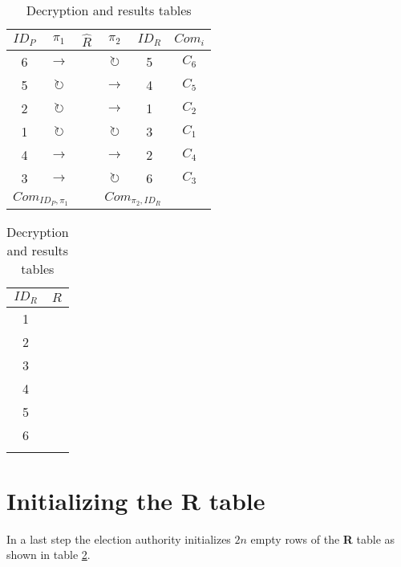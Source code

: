 \begin{table}[h]
	\begin{subtable}{.6\linewidth}
		\centering
		\begin{tabular}{|c|c|c|c|c|c|}
			\hline
			$ID_P$ & $\pi_1$ & $\hat{R}$ & $\pi_2$ & $ID_R$ & $Com_{i}$ \\
			\hline
			6 & $\rightarrow$       & & $\circlearrowright$ & 5 & $C_6$ \\
			5 & $\circlearrowright$ & & $\rightarrow$       & 4 & $C_5$ \\
			2 & $\circlearrowright$ & & $\rightarrow$       & 1 & $C_2$ \\
			1 & $\circlearrowright$ & & $\circlearrowright$ & 3 & $C_1$ \\
			4 & $\rightarrow$       & & $\rightarrow$       & 2 & $C_4$ \\
			3 & $\rightarrow$       & & $\circlearrowright$ & 6 & $C_3$ \\
			\hline
			\multicolumn{2}{|c|}{$Com_{ID_P, \pi_1}$} &   & \multicolumn{2}{c|}{$Com_{\pi_2, ID_R}$} & \\
			\hline
		\end{tabular}
		\caption{Decryption table}
		\label{tbl:d_table_full}
	\end{subtable}%
	\begin{subtable}{.4\linewidth}
		\centering
		\begin{tabular}{|c|c|}
			\hline
			$ID_R$ & $R$ \\
			\hline
			1 & \\
			2 & \\
			3 & \\
			4 & \\
			5 & \\
			6 & \\
			\hline
			\multicolumn{2}{l}{} %
		\end{tabular}
		\caption{Results table}
		\label{tbl:r_table_full}
	\end{subtable}
	\caption{Decryption and results tables}
\end{table}

\section{Initializing the \textbf{R} table}

In a last step the election authority initializes $2n$ empty rows of the
\textbf{R} table as shown in table \ref{tbl:r_table_full}.

